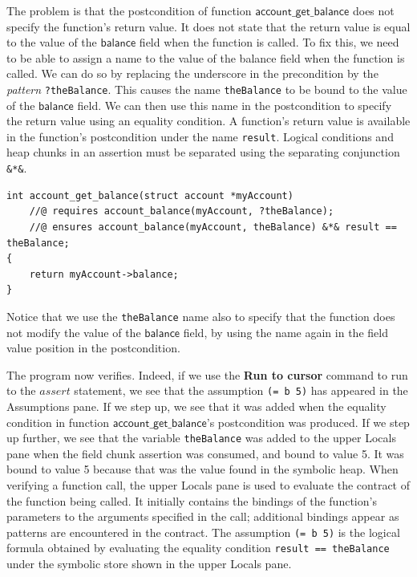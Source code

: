\documentclass{article}
\begin{document}
The problem is that the postcondition of function
$\mathsf{account\_get\_balance}$ does not specify the
function's return value. It does not state that the return
value is equal to the value of the $\mathsf{balance}$ field
when the function is called. To fix this, we need to be able to
assign a name to the value of the balance field when the
function is called. We can do so by replacing the underscore in
the precondition by the \emph{pattern} \lstinline!?theBalance!.
This causes the name \lstinline!theBalance! to be bound to the
value of the $\mathsf{balance}$ field. We can then use this
name in the postcondition to specify the return value using an
equality condition. A function's return value is available in
the function's postcondition under the name \lstinline!result!.
Logical conditions and heap chunks in an assertion must be
separated using the separating conjunction \lstinline!&*&!.
\begin{lstlisting}
int account_get_balance(struct account *myAccount)
    //@ requires account_balance(myAccount, ?theBalance);
    //@ ensures account_balance(myAccount, theBalance) &*& result == theBalance;
{
    return myAccount->balance;
}
\end{lstlisting}
Notice that we use the \lstinline!theBalance! name also to
specify that the function does not modify the value of the
$\mathsf{balance}$ field, by using the name again in the field
value position in the postcondition.

The program now verifies. Indeed, if we use the \textbf{Run to
cursor} command to run to the $\mathit{assert}$ statement, we
see that the assumption \lstinline!(= b 5)! has appeared in the
Assumptions pane. If we step up, we see that it was added when
the equality condition in function
$\mathsf{account\_get\_balance}$'s postcondition was produced.
If we step up further, we see that the variable
\lstinline!theBalance! was added to the upper Locals pane when
the field chunk assertion was consumed, and bound to value 5.
It was bound to value 5 because that was the value found in the
symbolic heap. When verifying a function call, the upper Locals
pane is used to evaluate the contract of the function being
called. It initially contains the bindings of the function's
parameters to the arguments specified in the call; additional
bindings appear as patterns are encountered in the contract.
The assumption \lstinline!(= b 5)! is the logical formula
obtained by evaluating the equality condition %
\lstinline!result == theBalance! under the symbolic store shown
in the upper Locals pane.
\end{document}
